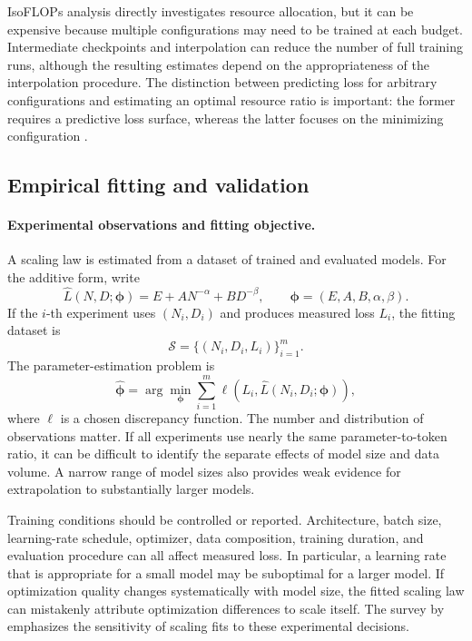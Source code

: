 IsoFLOPs analysis directly investigates resource allocation, but it can be
expensive because multiple configurations may need to be trained at each
budget. Intermediate checkpoints and interpolation can reduce the number of
full training runs, although the resulting estimates depend on the
appropriateness of the interpolation procedure. The distinction between
predicting loss for arbitrary configurations and estimating an optimal
resource ratio is important: the former requires a predictive loss surface,
whereas the latter focuses on the minimizing configuration
\parencite{Li2025MisFitting}.

\subsection{Empirical fitting and validation}
\label{subsec:scaling-estimation}

\paragraph{Experimental observations and fitting objective.}
A scaling law is estimated from a dataset of trained and evaluated models.
For the additive form, write
\begin{equation}
    \widehat{L}(N,D;\boldsymbol{\phi})
    =
    E+AN^{-\alpha}+BD^{-\beta},
    \qquad
    \boldsymbol{\phi}=(E,A,B,\alpha,\beta).
    \label{eq:scaling-fitted-function}
\end{equation}
If the \(i\)-th experiment uses \((N_i,D_i)\) and produces measured loss
\(L_i\), the fitting dataset is
\begin{equation}
    \mathcal{S}
    =
    \{(N_i,D_i,L_i)\}_{i=1}^{m}.
    \label{eq:scaling-fitting-dataset}
\end{equation}
The parameter-estimation problem is
\begin{equation}
    \widehat{\boldsymbol{\phi}}
    =
    \arg\min_{\boldsymbol{\phi}}
    \sum_{i=1}^{m}
    \ell\!\left(
        L_i,\widehat{L}(N_i,D_i;\boldsymbol{\phi})
    \right),
    \label{eq:scaling-general-fitting}
\end{equation}
where \(\ell\) is a chosen discrepancy function. The number and distribution
of observations matter. If all experiments use nearly the same
parameter-to-token ratio, it can be difficult to identify the separate
effects of model size and data volume. A narrow range of model sizes also
provides weak evidence for extrapolation to substantially larger models.

Training conditions should be controlled or reported. Architecture, batch
size, learning-rate schedule, optimizer, data composition, training duration,
and evaluation procedure can all affect measured loss. In particular, a
learning rate that is appropriate for a small model may be suboptimal for a
larger model. If optimization quality changes systematically with model
size, the fitted scaling law can mistakenly attribute optimization
differences to scale itself. The survey by \textcite{Li2025MisFitting}
emphasizes the sensitivity of scaling fits to these experimental decisions.

